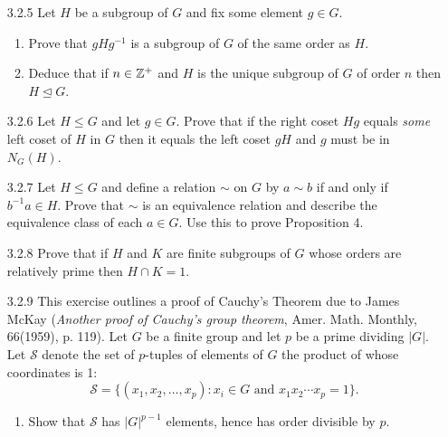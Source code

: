 \begin{enumerate}
      \textbf{Proof.} Suppose $|G| = pq$, for some primes $p$ and $q$. If
      $Z(G)$ is trivial, we are done, so assume $|Z(G)| > 1$. It follows by 
      Lagrange's Theorem that $|Z(G)| \in \{p, q, pq\}$. Thus
      $|G/Z(G)| \in \{1, p, q\}$, so that $G/Z(G)$ is cyclic by Corollary 3.10.
      Conclude by Exercise 3.1.36 that $G$ is abelian. \qed
   \item[3.2.5]   Let $H$ be a subgroup of $G$ and fix some element $g \in G$.
                  \begin{enumerate}
                     \item Prove that $gHg^{-1}$ is a subgroup of $G$ of the
                           same order as $H$.
                     \item Deduce that if $n \in \mathbb{Z}^+$ and $H$ is the unique
                           subgroup of $G$ of order $n$ then
                           $H \trianglelefteq G$.
                  \end{enumerate}
   \item[3.2.6]   Let $H \le G$ and let $g \in G$. Prove that if the right coset
                  $Hg$ equals \textit{some} left coset of $H$ in $G$ then it
                  equals the left coset $gH$ and $g$ must be in $N_G(H)$.
   \item[3.2.7]   Let $H \le G$ and define a relation $\sim$ on $G$ by
                  $a \sim b$ if and only if $b^{-1}a \in H$. Prove that $\sim$
                  is an equivalence relation and describe the equivalence class
                  of each $a \in G$. Use this to prove Proposition 4.
   \item[3.2.8]   Prove that if $H$ and $K$ are finite subgroups of $G$ whose
                  orders are relatively prime then $H \cap K = 1$.
   \item[3.2.9]   This exercise outlines a proof of Cauchy's Theorem due to
                  James McKay (\textit{Another proof of Cauchy's group theorem},
                  Amer. Math. Monthly, 66(1959), p. 119). Let $G$ be a finite
                  group and let $p$ be a prime dividing $|G|$. Let $\mathcal{S}$
                  denote the set of $p$-tuples of elements of $G$ the product of
                  whose coordinates is 1:
                  $$\mathcal{S} = \{(x_1, x_2, \ldots, x_p) : x_i \in G
                    \text{ and } x_1x_2 \cdots x_p = 1\}.$$
                  \begin{enumerate}
                     \item Show that $\mathcal{S}$ has $|G|^{p-1}$ elements,
                           hence has order divisible by $p$.


\end{enumerate}
\end{enumerate}
